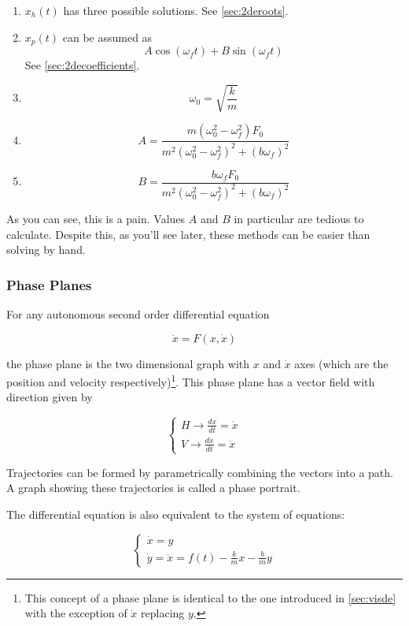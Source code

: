         \begin{enumerate}
            \item $x_h(t)$ has three possible solutions. See \eqref{sec:2deroots}.
            \item $x_p(t)$ can be assumed as
                \[ A \cos ( \omega_f t ) + B \sin ( \omega_f t )\]
                See \eqref{sec:2decoefficients}.
            \item \[ \omega_0 = \sqrt{\frac{k}{m}} \]
            \item \[ A = \frac{m (\omega_0^2 - \omega_f^2) F_0}{m^2{(\omega_0^2 - \omega_f^2)}^2 + {(b \omega_f)}^2} \]
            \item \[ B = \frac{b \omega_f F_0}{m^2{(\omega_0^2 - \omega_f^2)}^2 + {(b \omega_f)}^2} \]
        \end{enumerate}

        As you can see, this is a pain. Values $A$ and $B$ in particular are tedious to calculate. Despite this, as you'll see later, these methods can be easier than solving by hand.

        \subsubsection{Phase Planes}\label{sec:2depplane}
        For any autonomous second order differential equation

            \[ \ddot{x} = F(x, \dot{x}) \]

        the phase plane is the two dimensional graph with $x$ and $\dot{x}$ axes (which are the position and velocity respectively)\footnote{This concept of a phase plane is identical to the one introduced in \eqref{sec:visde} with the exception of $\dot{x}$ replacing $y$.}. This phase plane has a vector field with direction given by

            \[ \begin{cases}
                    H \to \frac{dx}{dt} = \dot{x}\\
                    V \to \frac{d\dot{x}}{dt} = \ddot{x}
                \end{cases} \]

        Trajectories can be formed by parametrically combining the vectors into a path. A graph showing these trajectories is called a phase portrait.

        The differential equation is also equivalent to the system of equations:

            \[ \begin{cases}
                    \dot{x} = y\\
                    \dot{y} = \ddot{x} = f(t) - \frac{k}{m} x - \frac{b}{m} y
                \end{cases} \]

